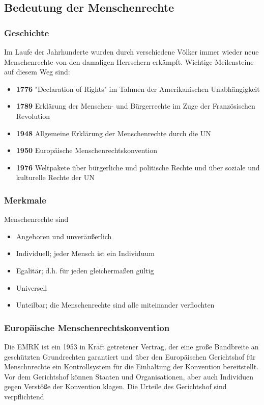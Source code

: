 \documentclass{article}
\begin{document}
	\subsection{Bedeutung der Menschenrechte}

	\subsubsection{Geschichte}
	Im Laufe der Jahrhunderte wurden durch verschiedene Völker immer wieder neue Menschenrechte von den damaligen Herrschern erkämpft. Wichtige Meilensteine auf diesem Weg sind:

	\begin{itemize}
		\item \textbf{1776} "Declaration of Rights" im Tahmen der Amerikanischen Unabhängigkeit
		\item \textbf{1789} Erklärung der Menschen- und Bürgerrechte im Zuge der Französischen Revolution
		\item \textbf{1948} Allgemeine Erklärung der Menschenrechte durch die UN
		\item \textbf{1950} Europäische Menschenrechtskonvention
		\item \textbf{1976} Weltpakete über bürgerliche und politische Rechte und über soziale und kulturelle Rechte der UN
	\end{itemize}

	\subsubsection{Merkmale}
	Menschenrechte sind

	\begin{itemize}
		\item Angeboren und unveräußerlich
		\item Individuell; jeder Mensch ist ein Individuum
		\item Egalitär; d.h. für jeden gleichermaßen gültig
		\item Universell
		\item Unteilbar; die Menschenrechte sind alle miteinander verflochten
	\end{itemize}

	\subsubsection{Europäische Menschenrechtskonvention}
	Die EMRK ist ein 1953 in Kraft getretener Vertrag, der eine große Bandbreite an geschützten Grundrechten garantiert und über den Europäischen Gerichtshof für Menschnrechte ein Kontrollsystem für die Einhaltung der Konvention bereitstellt. Vor dem Gerichtshof können Staaten und Organisationen, aber auch Individuen gegen Verstöße der Konvention klagen. Die Urteile des Gerichtshof sind verpflichtend
\end{document}
